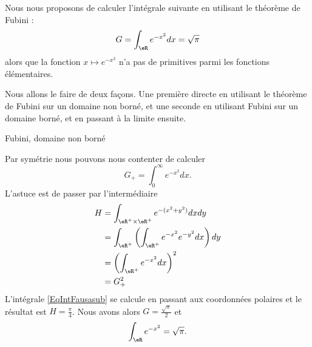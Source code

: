 \begin{example}  \label{EXooLUFAooGcxFUW}
    Nous nous proposons de calculer l'intégrale suivante en utilisant le théorème de Fubini :
    \begin{equation}
        G=\int_{\eR} e^{-x^2}dx=\sqrt{ \pi }
    \end{equation}
    alors que la fonction \( x\mapsto  e^{-x^2}\) n'a pas de primitives parmi les fonctions élémentaires.

    Nous allons le faire de deux façons. Une première directe en utilisant le théorème de Fubini sur un domaine non borné, et une seconde en utilisant Fubini sur un domaine borné, et en passant à la limite ensuite.

    \begin{subproof}
        \item[Fubini, domaine non borné]

    Par symétrie nous pouvons nous contenter de calculer
    \begin{equation}
        G_+=\int_0^{\infty} e^{-x^2}dx.
    \end{equation}
    L'astuce est de passer par l'intermédiaire
    \begin{subequations}
        \begin{align}
            H&=\int_{\eR^+\times\eR^+} e^{-(x^2+y^2)}dxdy       \label{EqIntFausasub}\\
            &=\int_{\eR^+}\left( \int_{\eR^+} e^{-x^2} e^{-y^2}dx \right)dy\\
            &=\left( \int_{\eR^+} e^{-x^2} dx\right)^2\\
            &=G_+^2
        \end{align}
    \end{subequations}
    L'intégrale \eqref{EqIntFausasub} se calcule en passant aux coordonnées polaires et le résultat est \( H=\frac{ \pi }{ 4 }\). Nous avons alors \( G=\frac{ \sqrt{\pi} }{ 2 }\) et
    \begin{equation}
        \int_{\eR} e^{-x^2}=\sqrt{\pi}.
    \end{equation}


\end{subproof}
\end{example}
